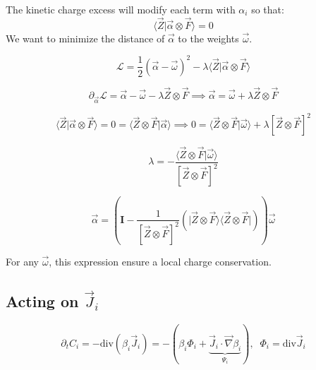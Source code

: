 \documentclass[aps,12pt]{revtex4}
\begin{document}
The kinetic charge excess will modify each term with $\alpha_i$ so that:
\begin{equation}
		\langle \vec Z \vert \vec \alpha \otimes \vec F \rangle = 0
\end{equation}
We want to minimize the distance of $\vec \alpha $ to the weights $\vec \omega$.

\begin{equation}
	\mathcal L = \dfrac{1}{2} \left( \vec \alpha - \vec\omega\right)^2 - \lambda \langle \vec Z \vert \vec \alpha \otimes \vec F \rangle
\end{equation} 

\begin{equation}
	\partial_{\vec \alpha} \mathcal L = \vec{\alpha} - \vec{\omega} - \lambda \vec Z \otimes \vec F  \implies \vec \alpha = \vec \omega + \lambda \vec Z \otimes \vec F
\end{equation}


\begin{equation}
\langle \vec Z \vert \vec \alpha \otimes \vec F \rangle = 0 =  \langle \vec Z \otimes \vec F \vert \vec \alpha \rangle \implies 
0 = \langle \vec Z \otimes \vec F \vert \vec \omega \rangle + \lambda \left[\vec Z \otimes \vec F\right]^2
\end{equation}

\begin{equation}
	\lambda = - \dfrac{\langle \vec Z \otimes \vec F \vert \vec \omega \rangle}{\left[\vec Z \otimes \vec F\right]^2}
\end{equation}

\begin{equation}
	\vec \alpha = \left( \bm{I} - \dfrac{1}{\left[\vec Z \otimes \vec F\right]^2}\left( \vert \vec Z \otimes \vec F \rangle \langle \vec Z \otimes \vec F \vert \right) 
	\right) \vec\omega
\end{equation}

For any $\vec\omega$, this expression ensure a local charge conservation.

\subsection{Acting on $\vec J_i$}

\begin{equation}
	\partial_t C_i = -\mathrm{div}\left( \beta_i \vec J_i \right) =  
	- \left( \beta_i \Phi_i + \underbrace{\vec J_i \cdot \vec \nabla \beta_i}_{\Psi_i} \right), \;\; \Phi_i = \mathrm{div} \vec J_i
\end{equation}
  
\end{document}
